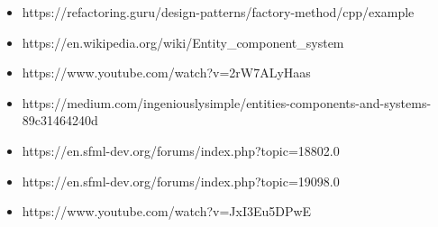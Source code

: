 \documentclass{article}
\begin{document}
\begin{itemize}
    \item https://refactoring.guru/design-patterns/factory-method/cpp/example
    \item https://en.wikipedia.org/wiki/Entity\_component\_system
    \item https://www.youtube.com/watch?v=2rW7ALyHaas
    \item https://medium.com/ingeniouslysimple/entities-components-and-systems-89c31464240d
    \item https://en.sfml-dev.org/forums/index.php?topic=18802.0
    \item https://en.sfml-dev.org/forums/index.php?topic=19098.0
    \item https://www.youtube.com/watch?v=JxI3Eu5DPwE
\end{itemize}
\end{document}

